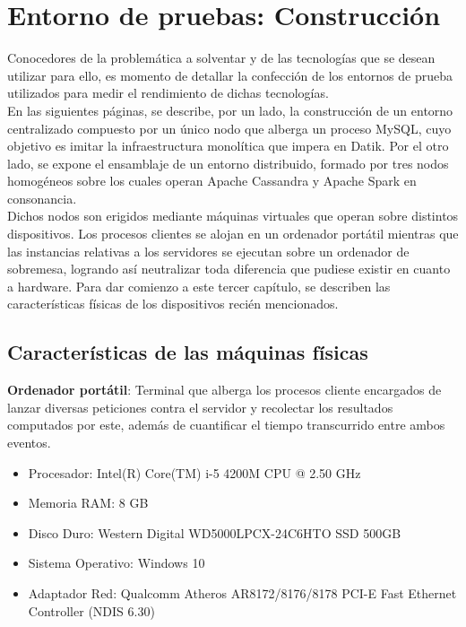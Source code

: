 
\pagestyle{fancy}

\chapter{Entorno de pruebas: Construcción}
\label{entorno_pruebas}

Conocedores de la problemática a solventar y de las tecnologías que se desean utilizar para ello, es momento de detallar la confección de los entornos de prueba utilizados para medir el rendimiento de dichas tecnologías.\\

En las siguientes páginas, se describe, por un lado, la construcción de un entorno centralizado compuesto por un único nodo que alberga un proceso MySQL, cuyo objetivo es imitar la infraestructura monolítica que impera en Datik. Por el otro lado, se expone el ensamblaje de un entorno distribuido, formado por tres nodos homogéneos sobre los cuales operan Apache Cassandra y Apache Spark en consonancia.\\

Dichos nodos son erigidos mediante máquinas virtuales que operan sobre distintos dispositivos. Los procesos clientes se alojan en un ordenador portátil mientras que las instancias relativas a los servidores se ejecutan sobre un ordenador de sobremesa, logrando así neutralizar toda diferencia que pudiese existir en cuanto a hardware. Para dar comienzo a este tercer capítulo, se describen las características físicas de los dispositivos recién mencionados.

\section{Características de las máquinas físicas}

\textbf{Ordenador portátil}: Terminal que alberga los procesos cliente encargados de lanzar diversas peticiones contra el servidor y recolectar los resultados computados por este, además de cuantificar el tiempo transcurrido entre ambos eventos.

\clearpage

\begin{itemize}
	\item Procesador: Intel(R) Core(TM) i-5 4200M CPU @ 2.50 GHz
	\item Memoria RAM: 8 GB
	\item Disco Duro: Western Digital WD5000LPCX-24C6HTO SSD 500GB
	\item Sistema Operativo: Windows 10
	\item Adaptador Red: Qualcomm Atheros AR8172/8176/8178 PCI-E Fast Ethernet Controller (NDIS 6.30)
\end{itemize}

